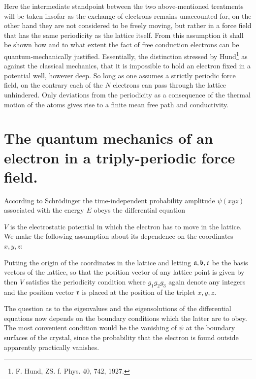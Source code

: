 \begin{paper}{1}
Here the intermediate standpoint between the two above-mentioned treatments will be taken insofar as the exchange of electrons remains unaccounted for, on the other hand they are not considered to be freely moving, but rather in a force field that has the same periodicity as the lattice itself. From this assumption it shall be shown how and to what extent the fact of free conduction electrons can be quantum-mechanically justified. Essentially, the distinction stressed by Hund\footnote{F. Hund, ZS. f. Phys. 40, 742, 1927.} as against the classical mechanics, that it is impossible to hold an electron fixed in a potential well, however deep.  So long as one assumes a strictly periodic force field, on the contrary each of the $N$ electrons can pass through the lattice unhindered. Only deviations from the periodicity as a consequence of the thermal motion of the atoms gives rise to a finite mean free path and conductivity.

\section{The quantum mechanics of an electron in a triply-periodic force field.}
According to Schr\"odinger the time-independent probability amplitude $\psi(xyz)$ associated with the energy $E$ obeys the differential equation

$V$ is the electrostatic potential in which the electron has to move in the lattice. We make the following assumption about its dependence on the coordinates $x,y,z$:

Putting the origin of the coordinates in the lattice and letting $\mathfrak{a},\mathfrak{b},\mathfrak{c}$ be the basis vectors of the lattice, so that the position vector of any lattice point is given by
then $V$ satisfies the periodicity condition
where $g_1g_2g_3$ again denote any integers and the position vector $\mathfrak{r}$ is placed at the position of the triplet $x,y,z$.

The question as to the eigenvalues and the eigensolutions of the differential equations now depends on the boundary conditions which the latter are to obey. The most convenient condition would be the vanishing of $\psi$ at the boundary surfaces of the crystal, since the probability that the electron is found outside apparently practically vanishes.


\end{paper}
